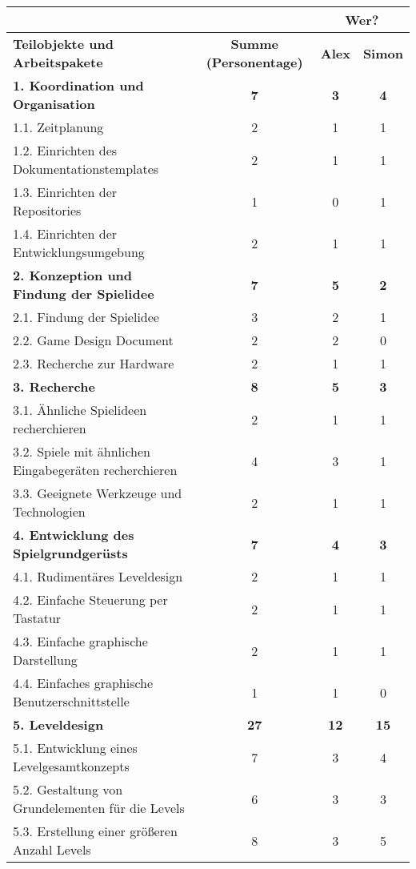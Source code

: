 \begingroup
\small
\begin{tabularx}{\textwidth}{|X|c|c|c|} \hline
 &  & \multicolumn{2}{c|}{\textbf{Wer?}} \\ \hline
\textbf{Teilobjekte und Arbeitspakete} & \textbf{Summe (Personentage)} & \textbf{Alex} & \textbf{Simon} \\ \hline
\textbf{1. Koordination und Organisation} & \textbf{7} & \textbf{3} & \textbf{4} \\ \hline
1.1. Zeitplanung & 2 & 1 & 1 \\ \hline
1.2. Einrichten des Dokumentationstemplates & 2 & 1 & 1 \\ \hline
1.3. Einrichten der Repositories & 1 & 0 & 1 \\ \hline
1.4. Einrichten der Entwicklungsumgebung & 2 & 1 & 1 \\ \hline
\textbf{2. Konzeption und Findung der Spielidee} & \textbf{7} & \textbf{5} & \textbf{2} \\ \hline
2.1. Findung der Spielidee & 3 & 2 & 1 \\ \hline
2.2. Game Design Document & 2 & 2 & 0 \\ \hline
2.3. Recherche zur Hardware & 2 & 1 & 1 \\ \hline
\textbf{3. Recherche} & \textbf{8} & \textbf{5} & \textbf{3} \\ \hline
3.1. Ähnliche Spielideen recherchieren & 2 & 1 & 1 \\ \hline
3.2. Spiele mit ähnlichen Eingabegeräten recherchieren & 4 & 3 & 1 \\ \hline
3.3. Geeignete Werkzeuge und Technologien & 2 & 1 & 1 \\ \hline
\textbf{4. Entwicklung des Spielgrundgerüsts} & \textbf{7} & \textbf{4} & \textbf{3} \\ \hline
4.1. Rudimentäres Leveldesign & 2 & 1 & 1 \\ \hline
4.2. Einfache Steuerung per Tastatur & 2 & 1 & 1 \\ \hline
4.3. Einfache graphische Darstellung & 2 & 1 & 1 \\ \hline
4.4. Einfaches graphische Benutzerschnittstelle & 1 & 1 & 0 \\ \hline
\textbf{5. Leveldesign} & \textbf{27} & \textbf{12} & \textbf{15} \\ \hline
5.1. Entwicklung eines Levelgesamtkonzepts & 7 & 3 & 4 \\ \hline
5.2. Gestaltung von Grundelementen für die Levels & 6 & 3 & 3 \\ \hline
5.3. Erstellung einer größeren Anzahl Levels & 8 & 3 & 5 \\ \hline

\end{tabularx}
